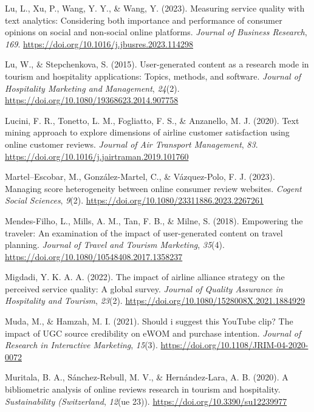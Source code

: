 \documentclass[
]{agujournal2019}
\newlength{\cslhangindent}
\newenvironment{CSLReferences}[2] %
 {\begin{list}{}{%
  \setlength{\itemindent}{0pt}
  \setlength{\leftmargin}{0pt}
  \setlength{\parsep}{0pt}
  \ifodd #1
   \setlength{\leftmargin}{\cslhangindent}
   \setlength{\itemindent}{-1\cslhangindent}
  \fi
  \setlength{\itemsep}{#2\baselineskip}}}
 {\end{list}}
\begin{document}
\begin{CSLReferences}{1}{0}
Lu, L., Xu, P., Wang, Y. Y., \& Wang, Y. (2023). Measuring service
quality with text analytics: Considering both importance and performance
of consumer opinions on social and non-social online platforms.
\emph{Journal of Business Research}, \emph{169}.
\url{https://doi.org/10.1016/j.jbusres.2023.114298}

Lu, W., \& Stepchenkova, S. (2015). User-generated content as a research
mode in tourism and hospitality applications: Topics, methods, and
software. \emph{Journal of Hospitality Marketing and Management},
\emph{24}(2). \url{https://doi.org/10.1080/19368623.2014.907758}

Lucini, F. R., Tonetto, L. M., Fogliatto, F. S., \& Anzanello, M. J.
(2020). Text mining approach to explore dimensions of airline customer
satisfaction using online customer reviews. \emph{Journal of Air
Transport Management}, \emph{83}.
\url{https://doi.org/10.1016/j.jairtraman.2019.101760}

Martel--Escobar, M., González-Martel, C., \& Vázquez-Polo, F. J. (2023).
Managing score heterogeneity between online consumer review websites.
\emph{Cogent Social Sciences}, \emph{9}(2).
\url{https://doi.org/10.1080/23311886.2023.2267261}

Mendes-Filho, L., Mills, A. M., Tan, F. B., \& Milne, S. (2018).
Empowering the traveler: An examination of the impact of user-generated
content on travel planning. \emph{Journal of Travel and Tourism
Marketing}, \emph{35}(4).
\url{https://doi.org/10.1080/10548408.2017.1358237}

Migdadi, Y. K. A. A. (2022). The impact of airline alliance strategy on
the perceived service quality: A global survey. \emph{Journal of Quality
Assurance in Hospitality and Tourism}, \emph{23}(2).
\url{https://doi.org/10.1080/1528008X.2021.1884929}

Muda, M., \& Hamzah, M. I. (2021). Should i suggest this YouTube clip?
The impact of UGC source credibility on eWOM and purchase intention.
\emph{Journal of Research in Interactive Marketing}, \emph{15}(3).
\url{https://doi.org/10.1108/JRIM-04-2020-0072}

Muritala, B. A., Sánchez-Rebull, M. V., \& Hernández-Lara, A. B. (2020).
A bibliometric analysis of online reviews research in tourism and
hospitality. \emph{Sustainability (Switzerland}, \emph{12}(ue 23)).
\url{https://doi.org/10.3390/su12239977}


\end{CSLReferences}
\end{document}
